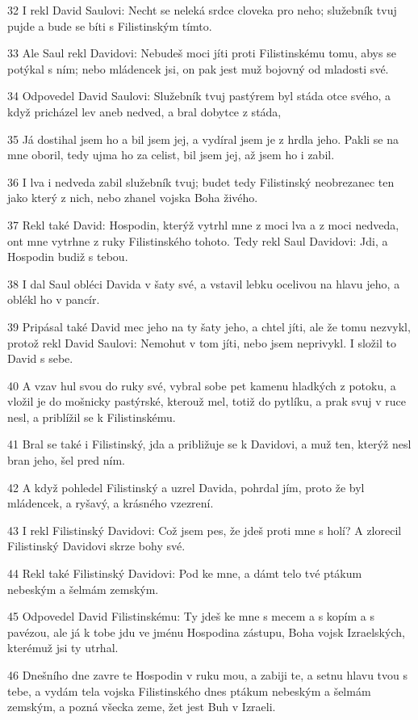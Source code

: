 \par 32 I rekl David Saulovi: Necht se neleká srdce cloveka pro neho; služebník tvuj pujde a bude se bíti s Filistinským tímto.
\par 33 Ale Saul rekl Davidovi: Nebudeš moci jíti proti Filistinskému tomu, abys se potýkal s ním; nebo mládencek jsi, on pak jest muž bojovný od mladosti své.
\par 34 Odpovedel David Saulovi: Služebník tvuj pastýrem byl stáda otce svého, a když pricházel lev aneb nedved, a bral dobytce z stáda,
\par 35 Já dostihal jsem ho a bil jsem jej, a vydíral jsem je z hrdla jeho. Pakli se na mne oboril, tedy ujma ho za celist, bil jsem jej, až jsem ho i zabil.
\par 36 I lva i nedveda zabil služebník tvuj; budet tedy Filistinský neobrezanec ten jako který z nich, nebo zhanel vojska Boha živého.
\par 37 Rekl také David: Hospodin, kterýž vytrhl mne z moci lva a z moci nedveda, ont mne vytrhne z ruky Filistinského tohoto. Tedy rekl Saul Davidovi: Jdi, a Hospodin budiž s tebou.
\par 38 I dal Saul obléci Davida v šaty své, a vstavil lebku ocelivou na hlavu jeho, a oblékl ho v pancír.
\par 39 Pripásal také David mec jeho na ty šaty jeho, a chtel jíti, ale že tomu nezvykl, protož rekl David Saulovi: Nemohut v tom jíti, nebo jsem neprivykl. I složil to David s sebe.
\par 40 A vzav hul svou do ruky své, vybral sobe pet kamenu hladkých z potoku, a vložil je do mošnicky pastýrské, kterouž mel, totiž do pytlíku, a prak svuj v ruce nesl, a priblížil se k Filistinskému.
\par 41 Bral se také i Filistinský, jda a približuje se k Davidovi, a muž ten, kterýž nesl bran jeho, šel pred ním.
\par 42 A když pohledel Filistinský a uzrel Davida, pohrdal jím, proto že byl mládencek, a ryšavý, a krásného vzezrení.
\par 43 I rekl Filistinský Davidovi: Což jsem pes, že jdeš proti mne s holí? A zlorecil Filistinský Davidovi skrze bohy své.
\par 44 Rekl také Filistinský Davidovi: Pod ke mne, a dámt telo tvé ptákum nebeským a šelmám zemským.
\par 45 Odpovedel David Filistinskému: Ty jdeš ke mne s mecem a s kopím a s pavézou, ale já k tobe jdu ve jménu Hospodina zástupu, Boha vojsk Izraelských, kterémuž jsi ty utrhal.
\par 46 Dnešního dne zavre te Hospodin v ruku mou, a zabiji te, a setnu hlavu tvou s tebe, a vydám tela vojska Filistinského dnes ptákum nebeským a šelmám zemským, a pozná všecka zeme, žet jest Buh v Izraeli.

